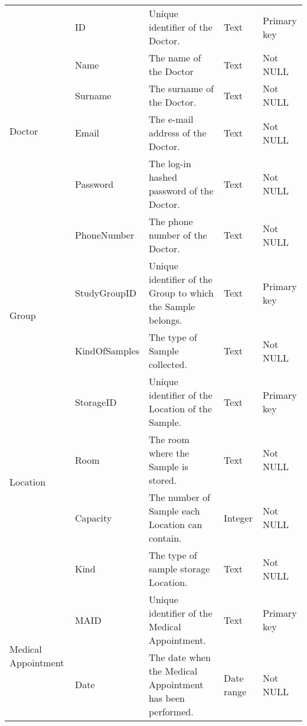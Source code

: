 \begin{longtable}{|p{}|p{} |p{}|p{}|p{} |}
\multirow{6}{*}{Doctor} 
&ID 
    &Unique identifier of the Doctor.
    &Text
    &Primary key
\\\cline{2-5}
&Name
    &The name of the Doctor
    &Text
    &Not NULL
\\\cline{2-5}
&Surname 
    &The surname of the Doctor.
    &Text
    &Not NULL
\\\cline{2-5}
&Email 
    &The e-mail address of the Doctor.
    &Text
    &Not NULL
\\\cline{2-5}
&Password 
    &The log-in hashed password of the Doctor.
    &Text
    &Not NULL
\\\cline{2-5}
&PhoneNumber 
    &The phone number of the Doctor.
    &Text
    &Not NULL
\\\hline

\multirow{2}{*}{Group} 
&StudyGroupID 
    &Unique identifier of the Group to which the Sample belongs.
    &Text
    &Primary key
\\\cline{2-5}
&KindOfSamples 
    &The type of Sample collected.
    &Text
    &Not NULL
\\\hline

\multirow{4}{*}{Location} 
&StorageID
    &Unique identifier of the Location of the Sample.
    &Text
    &Primary key
\\\cline{2-5}
&Room
    &The room where the Sample is stored.
    &Text
    &Not NULL
\\\cline{2-5}
&Capacity 
    &The number of Sample each Location can contain.
    &Integer
    &Not NULL
\\\cline{2-5}
&Kind 
    &The type of sample storage Location.
    &Text
    &Not NULL
\\\hline

\multirow{2}{*}{Medical Appointment} 
&MAID 
    &Unique identifier of the Medical Appointment.
    &Text
    &Primary key
\\\cline{2-5}
&Date
    &The date when the Medical Appointment has been performed.
    &Date range
    &Not NULL
\\\hline


\end{longtable}
